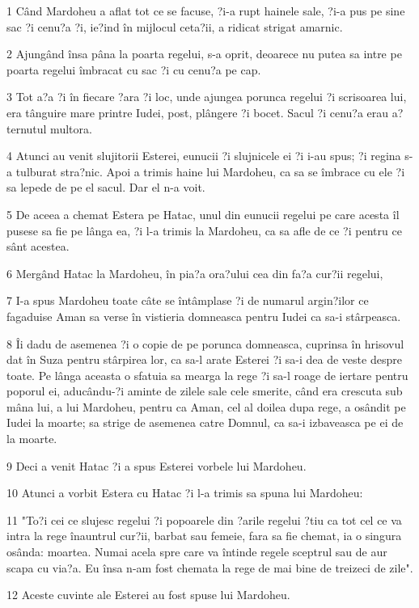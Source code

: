 \par 1 Când Mardoheu a aflat tot ce se facuse, ?i-a rupt hainele sale, ?i-a pus pe sine sac ?i cenu?a ?i, ie?ind în mijlocul ceta?ii, a ridicat strigat amarnic.
\par 2 Ajungând însa pâna la poarta regelui, s-a oprit, deoarece nu putea sa intre pe poarta regelui îmbracat cu sac ?i cu cenu?a pe cap.
\par 3 Tot a?a ?i în fiecare ?ara ?i loc, unde ajungea porunca regelui ?i scrisoarea lui, era tânguire mare printre Iudei, post, plângere ?i bocet. Sacul ?i cenu?a erau a?ternutul multora.
\par 4 Atunci au venit slujitorii Esterei, eunucii ?i slujnicele ei ?i i-au spus; ?i regina s-a tulburat stra?nic. Apoi a trimis haine lui Mardoheu, ca sa se îmbrace cu ele ?i sa lepede de pe el sacul. Dar el n-a voit.
\par 5 De aceea a chemat Estera pe Hatac, unul din eunucii regelui pe care acesta îl pusese sa fie pe lânga ea, ?i l-a trimis la Mardoheu, ca sa afle de ce ?i pentru ce sânt acestea.
\par 6 Mergând Hatac la Mardoheu, în pia?a ora?ului cea din fa?a cur?ii regelui,
\par 7 I-a spus Mardoheu toate câte se întâmplase ?i de numarul argin?ilor ce fagaduise Aman sa verse în vistieria domneasca pentru Iudei ca sa-i stârpeasca.
\par 8 Îi dadu de asemenea ?i o copie de pe porunca domneasca, cuprinsa în hrisovul dat în Suza pentru stârpirea lor, ca sa-l arate Esterei ?i sa-i dea de veste despre toate. Pe lânga aceasta o sfatuia sa mearga la rege ?i sa-l roage de iertare pentru poporul ei, aducându-?i aminte de zilele sale cele smerite, când era crescuta sub mâna lui, a lui Mardoheu, pentru ca Aman, cel al doilea dupa rege, a osândit pe Iudei la moarte; sa strige de asemenea catre Domnul, ca sa-i izbaveasca pe ei de la moarte.
\par 9 Deci a venit Hatac ?i a spus Esterei vorbele lui Mardoheu.
\par 10 Atunci a vorbit Estera cu Hatac ?i l-a trimis sa spuna lui Mardoheu:
\par 11 "To?i cei ce slujesc regelui ?i popoarele din ?arile regelui ?tiu ca tot cel ce va intra la rege înauntrul cur?ii, barbat sau femeie, fara sa fie chemat, ia o singura osânda: moartea. Numai acela spre care va întinde regele sceptrul sau de aur scapa cu via?a. Eu însa n-am fost chemata la rege de mai bine de treizeci de zile".
\par 12 Aceste cuvinte ale Esterei au fost spuse lui Mardoheu.
